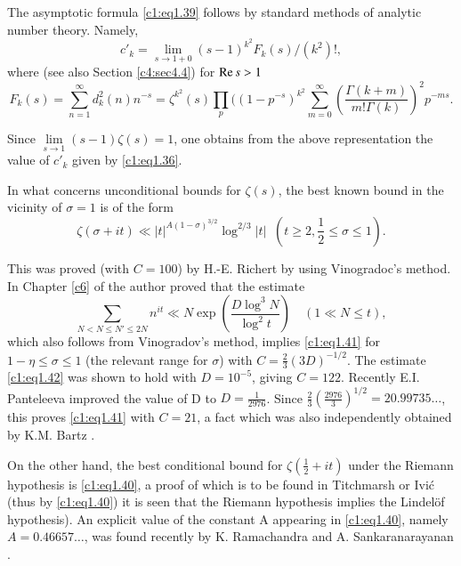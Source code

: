 The asymptotic formula \eqref{c1:eq1.39} follows by standard methods
of analytic number theory. Namely,
$$
c'_k = \lim\limits_{s \to 1+0} (s-1)^{k^2} F_k (s)/(k^2)!,
$$
where (see also Section \ref{c4:sec4.4}) for $\operatorname{Re} s> 1$
$$ 
F_k (s) = \sum^\infty_{n=1} d^2_k (n) n^{-s} = \zeta^{k^2}(s) \prod_p
((1-p^{-s})^{k^2} \sum^\infty_{m=0} \left(\frac{\Gamma (k+m)}{m! \Gamma
  (k)} \right)^2 p^{-ms}. 
$$

Since $\displaystyle{\lim\limits_{s \to 1}} (s-1) \zeta (s) =1$, one
obtains from the above representation the value of $c'_k$ given by
\eqref{c1:eq1.36}. 

In what concerns unconditional bounds for $\zeta(s)$, the best known
bound in the vicinity of $\sigma=1$ is of the form
\begin{equation}
\zeta (\sigma + it) \ll |t|^{A(1- \sigma)^{3/2}} \log^{2/3} |t| \;\;  (t \geq
2, \frac{1}{2} \leq \sigma \leq 1).
\label{c1:eq1.41}
\end{equation}

This was proved (with $C= 100$) by H.-E. Richert \cite{Richert1} by using
Vinogradoc's method. In Chapter \ref{c6} of \cite{Vinogradov1} the author proved that
the estimate 
\begin{equation}
  \sum_{N < N \leq N' \leq 2N} n^{it} \ll N \exp \left(\frac{D \log^3
    N}{\log^2 t} \right) \quad (1 \ll N \leq t),\label{c1:eq1.42}
\end{equation}
which also follows from Vinogradov's method, implies \eqref{c1:eq1.41}
for $1- \eta \leq \sigma \leq 1$ (the relevant range for $\sigma$)
with $C= \frac{2}{3} (3D)^{-1/2}$. The estimate \eqref{c1:eq1.42} was
shown to hold with $D= 10^{-5}$, giving $C= 122$. Recently
E.I. Panteleeva \cite{Panteleeva1} improved the value of D  to $D=
\frac{1}{2976}$. Since $\frac{2}{3} \left(
\frac{2976}{3}\right)^{1/2}= 20.99735\ldots$, this proves
\eqref{c1:eq1.41} with $C= 21$, a fact which was also independently
obtained by K.M. Bartz \cite{Bartz1}.

On the other hand, the best conditional bound for $\zeta \left(\frac{1}{2}
+ it\right)$ under the Riemann hypothesis is \eqref{c1:eq1.40}, a
proof of which is to be found in Titchmarsh \cite{Titchmarsh1} or Ivi\'c
\cite{Ivic1} (thus by \eqref{c1:eq1.40}) it is seen that the Riemann
hypothesis implies the Lindel\"of hypothesis). An explicit value of
the constant A appearing in \eqref{c1:eq1.40}, namely $A=
0.46657\ldots$, was found recently by K. Ramachandra and
A. Sankaranarayanan \cite{Ramachandra and Sankaranarayanan1}.


